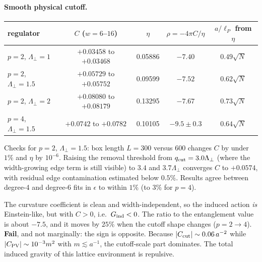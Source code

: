\documentclass[11pt]{article}
\begin{document}
\paragraph{Smooth physical cutoff.}
\begin{center}\small\begin{tabular}{lcccc}\toprule
regulator & $C$ ($w=6$--$16$) & $\eta$ & $\rho=-4\pi C/\eta$ & $a/\ell_P$ from $\eta$\\\midrule
$p=2$, $\Lambda_\perp=1$ & $+0.03458$ to $+0.03468$ & 0.05886 & $-7.40$ & $0.49\sqrt N$\\
$p=2$, $\Lambda_\perp=1.5$ & $+0.05729$ to $+0.05752$ & 0.09599 & $-7.52$ & $0.62\sqrt N$\\
$p=2$, $\Lambda_\perp=2$ & $+0.08080$ to $+0.08179$ & 0.13295 & $-7.67$ & $0.73\sqrt N$\\
$p=4$, $\Lambda_\perp=1.5$ & $+0.0742$ to $+0.0782$ & 0.10105 & $-9.5\pm0.3$ & $0.64\sqrt N$\\\bottomrule\end{tabular}\end{center}
Checks for $p=2$, $\Lambda_\perp=1.5$: box length $L=300$ versus $600$ changes $C$ by under $1\%$ and $\eta$ by $10^{-6}$. Raising the removal threshold from $q_{\rm cut}=3.0\Lambda_\perp$ (where the width-growing edge term is still visible) to $3.4$ and $3.7\Lambda_\perp$ converges $C$ to $+0.0574$, with residual edge contamination estimated below $0.5\%$. Results agree between degree-4 and degree-6 fits in $\epsilon$ to within $1\%$ (to $3\%$ for $p=4$).

The curvature coefficient is clean and width-independent, so the induced action \emph{is} Einstein-like, but with $C>0$, i.e.\ $G_{\rm ind}<0$. The ratio to the entanglement value is about $-7.5$, and it moves by $25\%$ when the cutoff shape changes ($p=2\to4$). \textbf{Fail}, and not marginally: the sign is opposite. Because $|C_{\rm cut}|\sim0.06\,a^{-2}$ while $|C_{\rm PV}|\sim10^{-3}m^2$ with $m\lesssim a^{-1}$, the cutoff-scale part dominates. The total induced gravity of this lattice environment is repulsive.
\end{document}
